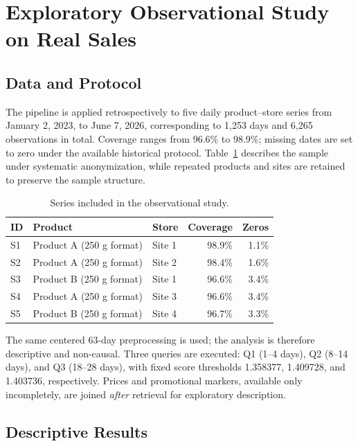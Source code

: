 \section{Exploratory Observational Study on Real Sales}

\subsection{Data and Protocol}

The pipeline is applied retrospectively to five daily product--store series from January 2, 2023, to June 7, 2026, corresponding to 1,253 days and 6,265 observations in total. Coverage ranges from 96.6\% to 98.9\%; missing dates are set to zero under the available historical protocol. Table~\ref{tab:real-series} describes the sample under systematic anonymization, while repeated products and sites are retained to preserve the sample structure.

\begin{table}[H]
\centering
\caption{Series included in the observational study.}
\label{tab:real-series}
\small
\begin{tabularx}{\textwidth}{@{}lXlrr@{}}
\toprule
ID & Product & Store & Coverage & Zeros \\
\midrule
S1 & Product A (250 g format) & Site 1 & 98.9\% & 1.1\% \\
S2 & Product A (250 g format) & Site 2 & 98.4\% & 1.6\% \\
S3 & Product B (250 g format) & Site 1 & 96.6\% & 3.4\% \\
S4 & Product A (250 g format) & Site 3 & 96.6\% & 3.4\% \\
S5 & Product B (250 g format) & Site 4 & 96.7\% & 3.3\% \\
\bottomrule
\end{tabularx}
\end{table}

The same centered 63-day preprocessing is used; the analysis is therefore descriptive and non-causal. Three queries are executed: Q1 (1--4 days), Q2 (8--14 days), and Q3 (18--28 days), with fixed score thresholds 1.358377, 1.409728, and 1.403736, respectively. Prices and promotional markers, available only incompletely, are joined \emph{after} retrieval for exploratory description.

\subsection{Descriptive Results}

